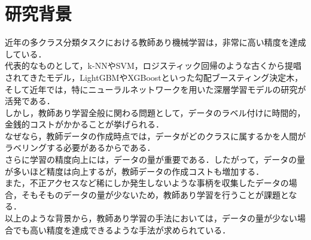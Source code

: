 \section{研究背景}

近年の多クラス分類タスクにおける教師あり機械学習は，非常に高い精度を達成している．\\
代表的なものとして，k-NNやSVM，ロジスティック回帰のような古くから提唱されてきたモデル，LightGBM\cite{lightgbm}やXGBoostといった勾配ブースティング決定木，そして近年では，特にニューラルネットワークを用いた深層学習モデルの研究が活発である．\\
しかし，教師あり学習全般に関わる問題として，データのラベル付けに時間的，金銭的コストがかかることが挙げられる．\\
なぜなら，教師データの作成時点では，データがどのクラスに属するかを人間がラベリングする必要があるからである．\\
さらに学習の精度向上には，データの量が重要である．したがって，データの量が多いほど精度は向上するが，教師データの作成コストも増加する．\\
また，不正アクセスなど稀にしか発生しないような事柄を収集したデータの場合，そもそものデータの量が少ないため，教師あり学習を行うことが課題となる．\\
以上のような背景から，教師あり学習の手法においては，データの量が少ない場合でも高い精度を達成できるような手法が求められている．\\
